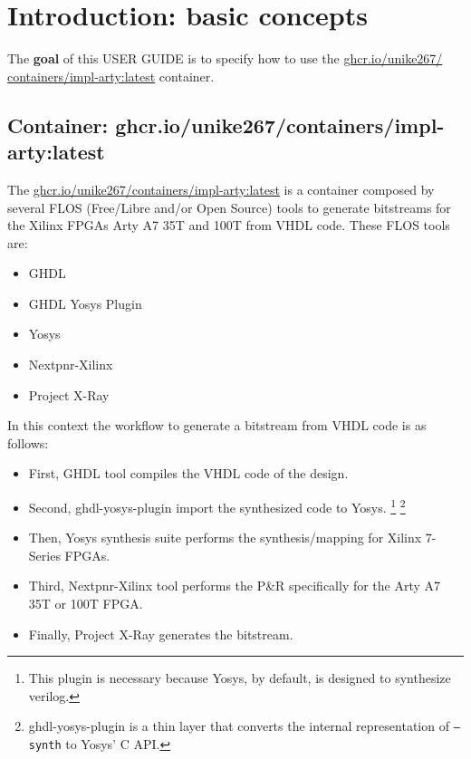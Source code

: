 \section{Introduction: basic concepts}

\label{intro}

The \textbf{goal} of this USER GUIDE is to specify how to use the \href{https://github.com/Unike267/Containers/pkgs/container/containers\%2Fimpl-arty}{ghcr.io/unike267/ containers/impl-arty:latest} container.

\subsection{Container: ghcr.io/unike267/containers/impl-arty:latest}

The \href{https://github.com/Unike267/Containers/pkgs/container/containers\%2Fimpl-arty}{ghcr.io/unike267/containers/impl-arty:latest} \cite{gh:container-implarty} is a container composed by several FLOS (Free/Libre and/or Open Source) tools to generate bitstreams for the Xilinx FPGAs Arty A7 35T and 100T from VHDL code.
These FLOS tools are:

\begin{itemize}
    \item GHDL \cite{gh:ghdl}
    \item GHDL Yosys Plugin \cite{gh:ghdl-plugin}
    \item Yosys \cite{gh:yosys} 
    \item Nextpnr-Xilinx \cite{gh:nextpnr-x}
    \item Project X-Ray \cite{gh:prjxray}
\end{itemize}

\noindent In this context the workflow to generate a bitstream from VHDL code is as follows:

\begin{itemize}
    \item First, GHDL tool compiles the VHDL code of the design.
    \item Second, ghdl-yosys-plugin import the synthesized code to Yosys. 
\footnote{This plugin is necessary because Yosys, by default, is designed to synthesize verilog.} 
\footnote{ghdl-yosys-plugin is a thin layer that converts the internal representation of \texttt{--synth} to Yosys’ C API.}
    \item Then, Yosys synthesis suite performs the synthesis/mapping for Xilinx 7-Series FPGAs.
    \item Third, Nextpnr-Xilinx tool performs the P\&R specifically for the Arty A7 35T or 100T FPGA.
    \item Finally, Project X-Ray generates the bitstream.
\end{itemize}

